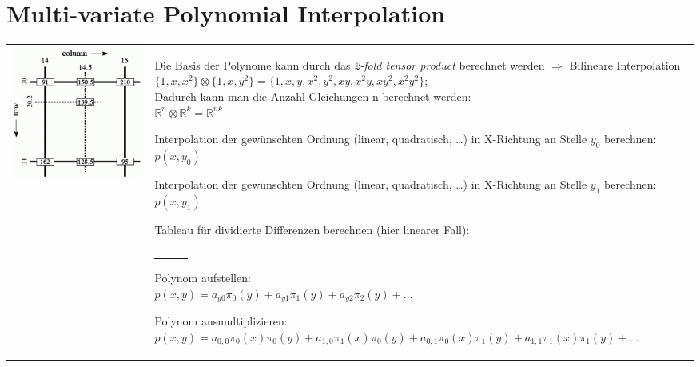 \section{Multi-variate Polynomial Interpolation}
\begin{tabular}{ll}
  \parbox{6cm}{
    \includegraphics[width=6cm]{./bilder/bilineare_interpolation}
  }
  & \parbox{12.5cm} {
    \begin{aufzaehlung}
      \item 
        Die Basis der Polynome kann durch das \emph{2-fold tensor product} berechnet werden $\Rightarrow$ Bilineare Interpolation \\
        $\{1,x,x^2\} \otimes \{1, x, y^2\} = \{1,x,y,x^2,y^2,xy, x^2y, xy^2, x^2y^2\}$; \\
        Dadurch kann man die Anzahl Gleichungen n berechnet werden: \\$\mathbb R^n \otimes \mathbb R^k = \mathbb R^{nk}$
      \item Interpolation der gewünschten Ordnung (linear, quadratisch, \ldots) in X-Richtung an 
        Stelle $y_0$ berechnen: $p(x,y_0)$
      \item Interpolation der gewünschten Ordnung (linear, quadratisch, \ldots) in X-Richtung an 
        Stelle $y_1$ berechnen: $p(x,y_1)$
      \item Tableau für dividierte Differenzen berechnen (hier linearer Fall):\\
        \begin{tabular}{l|ll}
          $y$ & $z$\\
          \hline
          $y_0$ & $p(x,y_0) = a_{y0}$\\
          $y_1$ & $p(x,y_1)$ & $\frac{p(x,y_1) - p(x,y_0)}{y_1-y_0} = a_{y1}$
        \end{tabular}
      \item Polynom aufstellen:\\
        $p(x,y) = a_{y0} \pi_0(y) + a_{y1} \pi_1(y) + a_{y2} \pi_2(y)+\ldots$
      \item Polynom ausmultiplizieren:\\
          $p(x,y) = a_{0,0} \pi_0(x)\pi_0(y) + a_{1,0} \pi_1(x)\pi_0(y) + a_{0,1} \pi_0(x)\pi_1(y) + a_{1,1} \pi_1(x)\pi_1(y)+\ldots$ 
    \end{aufzaehlung}
  }

\end{tabular}
